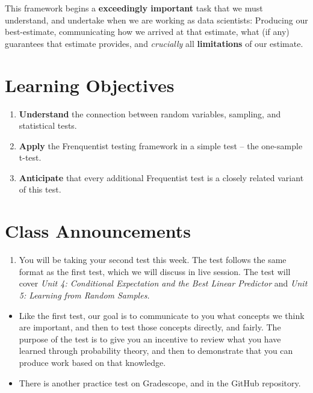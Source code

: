 \documentclass[
]{book}
\providecommand{\tightlist}{%
  \setlength{\itemsep}{0pt}\setlength{\parskip}{0pt}}
\theoremstyle{definition}
\theoremstyle{definition}
\theoremstyle{definition}
\theoremstyle{definition}
\theoremstyle{remark}
\begin{document}
This framework begins a \textbf{exceedingly important} task that we must understand, and undertake when we are working as data scientists: Producing our best-estimate, communicating how we arrived at that estimate, what (if any) guarantees that estimate provides, and \emph{crucially} all \textbf{limitations} of our estimate.

\hypertarget{learning-objectives-5}{%
\section{Learning Objectives}\label{learning-objectives-5}}

\begin{enumerate}
\def\labelenumi{\arabic{enumi}.}
\tightlist
\item
  \textbf{Understand} the connection between random variables, sampling, and statistical tests.
\item
  \textbf{Apply} the Frenquentist testing framework in a simple test -- the one-sample t-test.
\item
  \textbf{Anticipate} that every additional Frequentist test is a closely related variant of this test.
\end{enumerate}

\hypertarget{class-announcements-4}{%
\section{Class Announcements}\label{class-announcements-4}}

\begin{enumerate}
\def\labelenumi{\arabic{enumi}.}
\tightlist
\item
  You will be taking your second test this week. The test follows the same format as the first test, which we will discuss in live session. The test will cover \emph{Unit 4: Conditional Expectation and the Best Linear Predictor} and \emph{Unit 5: Learning from Random Samples.}
\end{enumerate}

\begin{itemize}
\tightlist
\item
  Like the first test, our goal is to communicate to you what concepts we think are important, and then to test those concepts directly, and fairly. The purpose of the test is to give you an incentive to review what you have learned through probability theory, and then to demonstrate that you can produce work based on that knowledge.
\item
  There is another practice test on Gradescope, and in the GitHub repository.
\end{itemize}
\end{document}

